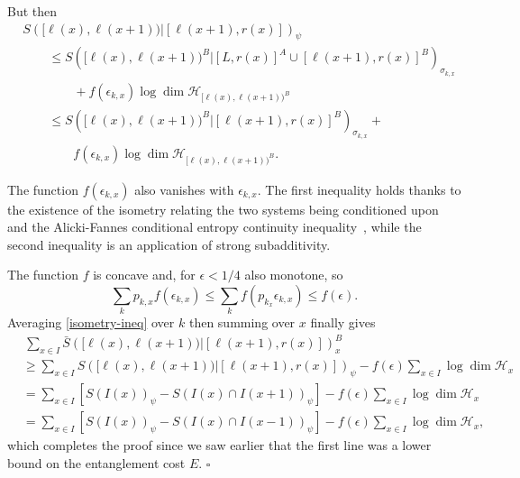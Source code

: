 \documentclass[12pt]{article}
\newcommand{\sbr}{\bar{S}}
\begin{document}
But then
\begin{equation}
\begin{aligned}
{} & S \left( [\ell(x), \ell(x+1) ) \big| [\ell(x+1),r(x)] \right)_\psi
\\
&\qquad \leq S \left( [\ell(x), \ell(x+1) )^B \big| [L,r(x)]^A  \cup [\ell(x+1),r(x)]^B \right)_{\sigma_{k,x}}\\
& \qquad\qquad + f(\epsilon_{k,x}) \log \dim \mathcal{H}_{[\ell(x),\ell(x+1))^B}  \\
&\qquad \leq
S \left( [\ell(x), \ell(x+1) )^B \big| [\ell(x+1),r(x)]^B \right)_{\sigma_{k,x}} +\\ 
& \qquad\qquad f(\epsilon_{k,x}) \log \dim \mathcal{H}_{[\ell(x),\ell(x+1))^B}. \label{isometry-ineq}
\end{aligned}
\end{equation}

The function $f(\epsilon_{k,x})$ also vanishes with $\epsilon_{k,x}$.
The first inequality holds thanks to the existence of the isometry relating the two systems being conditioned upon and the Alicki-Fannes conditional entropy continuity inequality~\cite{alicki2004continuity}, while the second inequality is an application of strong subadditivity.

The function $f$ is concave and, for $\epsilon < 1/4$ also monotone, so
\begin{equation}
\sum_k p_{k,x} f( \epsilon_{k,x} ) \leq \sum_k f( p_{k_x} \epsilon_{k,x} ) \leq f ( \epsilon ).
\end{equation}
Averaging \eqref{isometry-ineq} over $k$ then summing over $x$ finally gives
\begin{align}
&\, \sum_{x \in I} \sbr\left( [ \ell(x), \ell(x+1) ) \big| [ \ell(x+1), r(x) ] \right)^B_x \nonumber \\
&\geq
\sum_{x \in I} S \left( [\ell(x), \ell(x+1) ) \big| [\ell(x+1),r(x)] \right)_\psi - f(\epsilon) \sum_{x \in I}\log \dim \mathcal{H}_x \nonumber \\
&= \sum_{x \in I} \left[ S( I(x) )_\psi - S( I(x) \cap I(x + 1) )_\psi \right] - f(\epsilon) \sum_{x \in I}\log \dim \mathcal{H}_x  \nonumber \\
&= \sum_{x \in I} \left[ S( I(x) )_\psi - S( I(x) \cap I(x - 1) )_\psi \right] - f(\epsilon) \sum_{x \in I}\log \dim \mathcal{H}_x ,
\end{align}
which completes the proof since we saw earlier that the first line was a lower bound on the entanglement cost $E$. $\square$
\end{document}
